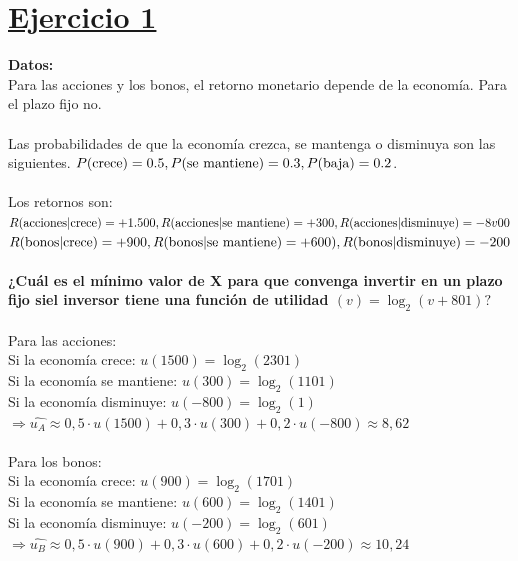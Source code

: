 \documentclass{article}
\begin{document}
    \section*{\underline{Ejercicio 1}}
        \textbf{Datos:}
        \\
        Para las acciones y los bonos, el retorno monetario depende de la economía. Para el plazo fijo no.
        \\
        \\
        Las probabilidades de que la economía crezca, se mantenga o disminuya son las siguientes. \(P($crece$) = 0.5, P($se mantiene$) = 0.3, P($baja$) = 0.2\).
        \\
        \\
        Los retornos son:
        \\
        \(R($acciones$ | $crece$) = +1.500, R($acciones$ | $se mantiene$) = +300, R($acciones$ | $disminuye$) = -8 v00\)
        \\
        \(R($bonos$ | $crece$) = +900, R($bonos$ | $se mantiene$) = +600), R($bonos$ | $disminuye$) = -200\)
        \\
        \\
        \textbf{¿Cuál es el mínimo valor de X para que convenga invertir en un plazo fijo siel inversor tiene una función de utilidad \((v)= \log_{2}(v+801)?\)}
        \\
        \\
        Para las acciones:
        \\
        Si la economía crece: \(u(1500) = \log_{2}(2301)\)
        \\
        Si la economía se mantiene: \(u(300) = \log_{2}(1101)\)
        \\
        Si la economía disminuye: \(u(-800) = \log_{2}(1)\)
        \\
        \(\Rightarrow \hat{u_{A}} \approx 0,5 \cdot u(1500) + 0,3 \cdot u(300) + 0,2 \cdot u(-800) \approx 8,62\)
        \\
        \\
        Para los bonos:
        \\
        Si la economía crece: \(u(900) = \log_{2}(1701)\)
        \\
        Si la economía se mantiene: \(u(600) = \log_{2}(1401)\)
        \\
        Si la economía disminuye: \(u(-200) = \log_{2}(601)\)
        \\
        \(\Rightarrow \hat{u_{B}} \approx 0,5 \cdot u(900) + 0,3 \cdot u(600) + 0,2 \cdot u(-200) \approx 10,24\)
\end{document}
